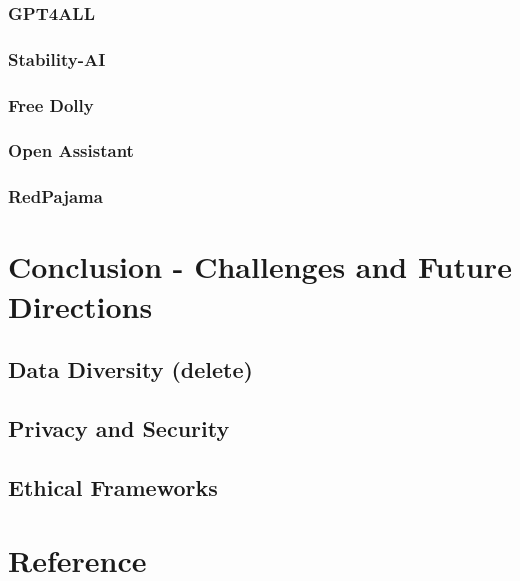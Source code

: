 \documentclass[
]{book}
\begin{document}
\hypertarget{gpt4all}{%
\subsection{GPT4ALL}\label{gpt4all}}

\hypertarget{stability-ai}{%
\subsection{Stability-AI}\label{stability-ai}}

\hypertarget{free-dolly}{%
\subsection{Free Dolly}\label{free-dolly}}

\hypertarget{open-assistant}{%
\subsection{Open Assistant}\label{open-assistant}}

\hypertarget{redpajama}{%
\subsection{RedPajama}\label{redpajama}}

\hypertarget{conclusion---challenges-and-future-directions}{%
\chapter{Conclusion - Challenges and Future Directions}\label{conclusion---challenges-and-future-directions}}

\hypertarget{data-diversity-delete}{%
\section{Data Diversity (delete)}\label{data-diversity-delete}}

\hypertarget{privacy-and-security}{%
\section{Privacy and Security}\label{privacy-and-security}}

\hypertarget{ethical-frameworks}{%
\section{Ethical Frameworks}\label{ethical-frameworks}}

\hypertarget{reference}{%
\chapter{Reference}\label{reference}}

  
\end{document}
